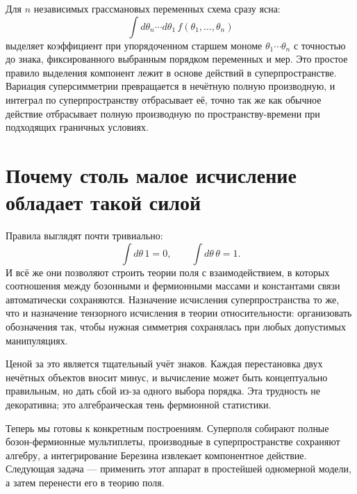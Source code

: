 Для \(n\) независимых грассмановых переменных схема сразу ясна:
\begin{equation}
\int d\theta_n\cdots d\theta_1\,
f(\theta_1,\ldots,\theta_n)
\end{equation}
выделяет коэффициент при упорядоченном старшем мономе \(\theta_1\cdots\theta_n\) с точностью до знака, фиксированного выбранным порядком переменных и мер. Это простое правило выделения компонент лежит в основе действий в суперпространстве. Вариация суперсимметрии превращается в нечётную полную производную, и интеграл по суперпространству отбрасывает её, точно так же как обычное действие отбрасывает полную производную по пространству-времени при подходящих граничных условиях.

\section{Почему столь малое исчисление обладает такой силой}

Правила выглядят почти тривиально:
\begin{equation}
\int d\theta\,1=0,
\qquad
\int d\theta\,\theta=1.
\end{equation}
И всё же они позволяют строить теории поля с взаимодействием, в которых соотношения между бозонными и фермионными массами и константами связи автоматически сохраняются. Назначение исчисления суперпространства то же, что и назначение тензорного исчисления в теории относительности: организовать обозначения так, чтобы нужная симметрия сохранялась при любых допустимых манипуляциях.

Ценой за это является тщательный учёт знаков. Каждая перестановка двух нечётных объектов вносит минус, и вычисление может быть концептуально правильным, но дать сбой из-за одного выбора порядка. Эта трудность не декоративна; это алгебраическая тень фермионной статистики.

\begin{classroomqa}
\end{classroomqa}

Теперь мы готовы к конкретным построениям. Суперполя собирают полные бозон-фермионные мультиплеты, производные в суперпространстве сохраняют алгебру, а интегрирование Березина извлекает компонентное действие. Следующая задача — применить этот аппарат в простейшей одномерной модели, а затем перенести его в теорию поля.
